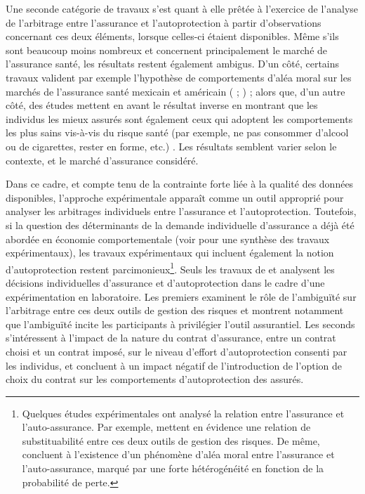 \begin{Article}
\begin{refsection}[Mouminoux]
Une seconde catégorie de travaux s'est quant à elle prêtée à l'exercice de l'analyse de l'arbitrage entre l'assurance et l'autoprotection à partir d'observations concernant ces deux éléments, lorsque celles-ci étaient disponibles. Même s'ils sont beaucoup moins nombreux et concernent principalement le marché de l'assurance santé, les résultats restent également ambigus. D'un côté, certains travaux valident par exemple l'hypothèse de comportements d'aléa moral sur les marchés de l'assurance santé mexicain et américain (\textcite{s12} ; \textcite{s08}) ; alors que, d'un autre côté, des études mettent en avant le résultat inverse en montrant que les individus les mieux assurés sont également ceux qui adoptent les comportements les plus sains vis-à-vis du risque santé (par exemple, ne pas consommer d'alcool ou de cigarettes, rester en forme, etc.) \parencite{cd04,cl10,ff09,k94}. Les résultats semblent varier selon le contexte, et le marché d'assurance considéré.

Dans ce cadre, et compte tenu de la contrainte forte liée à la qualité des données disponibles, l'approche expérimentale apparaît comme un outil approprié pour analyser les arbitrages individuels entre l'assurance et l'autoprotection. Toutefois, si la question des déterminants de la demande individuelle d'assurance a déjà été abordée en économie comportementale (voir \textcite{j16} pour une synthèse des travaux expérimentaux), les travaux expérimentaux qui incluent également la notion d'autoprotection restent parcimonieux\footnote{Quelques études expérimentales ont analysé la relation entre l'assurance et l'auto-assurance. Par exemple, \textcite{pcm20} mettent en évidence une relation de substituabilité entre ces deux outils de gestion des risques. De même, \textcite{mbb20} concluent à l'existence d'un phénomène d'aléa moral entre l'assurance et l'auto-assurance, marqué par une forte hétérogénéité en fonction de la probabilité de perte.}. Seuls les travaux de \textcite{bct15} et \textcite{p22} analysent les décisions individuelles d'assurance et d'autoprotection dans le cadre d'une expérimentation en laboratoire. Les premiers examinent le rôle de l'ambiguïté sur l'arbitrage entre ces deux outils de gestion des risques et montrent notamment que l'ambiguïté incite les participants à privilégier l'outil assurantiel. Les seconds s'intéressent à l'impact de la nature du contrat d'assurance, entre un contrat choisi et un contrat imposé, sur le niveau d'effort d'autoprotection consenti par les individus, et concluent à un impact négatif de l'introduction de l'option de choix du contrat sur les comportements d'autoprotection des assurés.


\end{refsection}
\end{Article}
